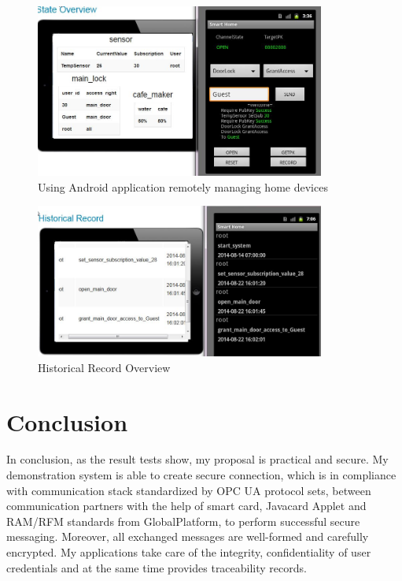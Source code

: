 \begin{figure}[!htb]
	\centering
	\includegraphics[width=0.85\textwidth]{Images/impl/housing-device.jpg}
		\caption{Using Android application remotely managing home devices}
	\label{fig:housing-device}
\end{figure}

\begin{figure}[!htb]
	\centering
	\includegraphics[width=0.85\textwidth]{Images/impl/record-query.jpg}
		\caption{Historical Record Overview}
	\label{fig:record-query}
\end{figure}

\section{Conclusion}
In conclusion, as the result tests show, my proposal is practical and secure. My demonstration system is able to create secure connection, which is  in compliance with communication stack standardized by OPC UA protocol sets, between communication partners with the help of smart card, Javacard Applet and RAM/RFM standards from GlobalPlatform, to perform successful secure messaging. Moreover, all exchanged messages are well-formed and carefully encrypted. My applications take care of the integrity, confidentiality of user credentials and at the same time provides traceability records.